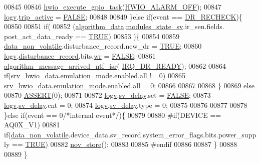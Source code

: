 \begin{DoxyCode}
00845 
00846           \hyperlink{a00058_a0af9eae455fbdf4e77def5bfffa109cb}{hwio\_execute\_gpio\_task}(\hyperlink{a00058_a17401c2732dee3a19b55a210870b6d8d}{HWIO\_ALARM\_OFF});
00847           \hyperlink{a00038_a2e89c46668b39a17753c238950c9e1ec}{logv}.\hyperlink{a00021_a32ebd32977bc9831cd68530b2b7ec664}{trip\_active}   = \hyperlink{a00040_aa93f0eb578d23995850d61f7d61c55c1}{FALSE};
00848           
00849     \}\textcolor{keywordflow}{else} \textcolor{keywordflow}{if}(event == \hyperlink{a00021_a6e67f9a00e51668436c0395616f43e88}{DR\_RECHECK})\{
00850                     
00851             \textcolor{keywordflow}{if}(
00852               (\hyperlink{a00038_a183caa40cd01e79ee309cc9c4a225197}{algorithm\_data}.\hyperlink{a00016_a293140e240bbd54f7601adbc9194148c}{modules\_state\_sv}.ir\_sen.fields.
      post\_act\_data\_ready == \hyperlink{a00040_aa8cecfc5c5c054d2875c03e77b7be15d}{TRUE})
00853              )\{
00854 
00859            \hyperlink{a00060_a76ac5f917f5308dcd83de0d7c94559fb}{data\_non\_volatile}.disturbance\_record.new\_dr = \hyperlink{a00040_aa8cecfc5c5c054d2875c03e77b7be15d}{TRUE};
00860            \hyperlink{a00038_a2e89c46668b39a17753c238950c9e1ec}{logv}.\hyperlink{a00021_a11ed024c2cc5c53c79b2c0a8b35e3c06}{disturbance\_record}.bits.\hyperlink{a00021_a11ea0eda9ab27873198e7a5c4be4337d}{wr} = \hyperlink{a00040_aa93f0eb578d23995850d61f7d61c55c1}{FALSE};
00861        \hyperlink{a00038_a85471d58eae93d5d7e7e2b52e2b915d3}{algorithm\_message\_arrived\_ntf\_isr}(
      \hyperlink{a00021_acfd80444497090bce928df199247a0ec}{IRQ\_DR\_READY});
00862 
00864            \textcolor{keywordflow}{if}(\hyperlink{a00034_a0fd91014631926f362c7c2b2f5d143b0}{srv\_hwio\_data}.\hyperlink{a00034_a742dceaef1f19ec73ed5acc066127476}{emulation\_mode}.enabled.all != 0)
00865                \hyperlink{a00034_a0fd91014631926f362c7c2b2f5d143b0}{srv\_hwio\_data}.\hyperlink{a00034_a742dceaef1f19ec73ed5acc066127476}{emulation\_mode}.enabled.all = 0;
00866 
00867 
00868        \}
00869        \textcolor{keywordflow}{else}
00870           \hyperlink{a00072_abb8ff8e213ac9f6fb21d2b968583b936}{ASSERT}(0);
00871 
00872             \hyperlink{a00038_a2e89c46668b39a17753c238950c9e1ec}{logv}.\hyperlink{a00021_a854b8f967c206a5f3e4aeaf91a782b3e}{sv\_delay}.set  = \hyperlink{a00040_aa93f0eb578d23995850d61f7d61c55c1}{FALSE};
00873             \hyperlink{a00038_a2e89c46668b39a17753c238950c9e1ec}{logv}.\hyperlink{a00021_a854b8f967c206a5f3e4aeaf91a782b3e}{sv\_delay}.cnt  = 0;
00874             \hyperlink{a00038_a2e89c46668b39a17753c238950c9e1ec}{logv}.\hyperlink{a00021_a854b8f967c206a5f3e4aeaf91a782b3e}{sv\_delay}.type = 0;
00875 
00876        
00877 
00878     \}\textcolor{keywordflow}{else} \textcolor{keywordflow}{if}(event == 0\textcolor{comment}{/*internal event*/})\{
00879 
00880 \textcolor{preprocessor}{#if(DEVICE == AQ0X\_V1)}
00881     \textcolor{keywordflow}{if}(\hyperlink{a00060_a76ac5f917f5308dcd83de0d7c94559fb}{data\_non\_volatile}.device\_data.sv\_record.system\_error\_flags.bits.power\_supply == 
      \hyperlink{a00040_aa8cecfc5c5c054d2875c03e77b7be15d}{TRUE})
00882        \hyperlink{a00029_a90aef186f45a15d94bf0247122194991}{nov\_store}();
00883 
00885 \textcolor{preprocessor}{#endif}
00886       
00887     \}
00888 
00889 \}
\end{DoxyCode}


